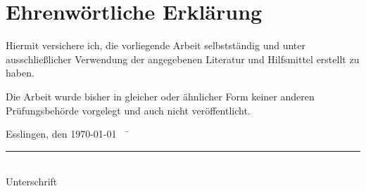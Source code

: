 \chapter*{Ehrenwörtliche Erklärung}
\thispagestyle{empty}
Hiermit versichere ich, die vorliegende Arbeit selbstständig und unter ausschließlicher Verwendung der angegebenen
Literatur und Hilfsmittel erstellt zu haben.

Die Arbeit wurde bisher in gleicher oder ähnlicher Form keiner anderen Prüfungsbehörde vorgelegt und auch nicht
veröffentlicht.

\begin{tabbing}
          Esslingen, den \today ~~	\= \rule{6cm}{0.3mm}\\ \> Unterschrift
\end{tabbing}





\frontmatter

\tableofcontents


\printglossary[type=\acronymtype, style=long, title=Abkürzungsverzeichnis]
\newpage


\mainmatter


















